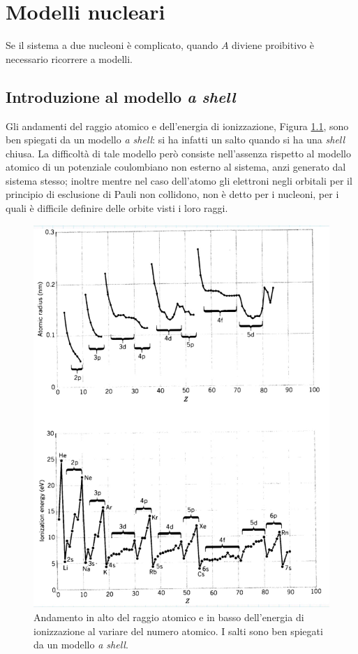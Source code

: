 \chapter{Modelli nucleari}
Se il sistema a due nucleoni è complicato, quando $A$ diviene proibitivo è necessario ricorrere a modelli.
\section{Introduzione al modello \textit{a shell}}
Gli andamenti del raggio atomico e dell'energia di ionizzazione, Figura \ref{rE}, sono ben spiegati da un modello \textit{a shell}: si ha infatti un salto quando si ha una \textit{shell} chiusa. La difficoltà di tale modello però consiste nell'assenza rispetto al modello atomico di un potenziale coulombiano non esterno al sistema, anzi generato dal sistema stesso; inoltre mentre nel caso dell'atomo gli elettroni negli orbitali per il principio di esclusione di Pauli non collidono, non è detto per i nucleoni, per i quali è difficile definire delle orbite visti i loro raggi.
\begin{figure}[!h]
    \centering
    \includegraphics[scale=0.23]{Immagini/ratm-Eion.png}
    \caption{Andamento in alto del raggio atomico e in basso dell'energia di ionizzazione al variare del numero atomico. I salti sono ben spiegati da un modello \textit{a shell}.}
    \label{rE}
\end{figure}
